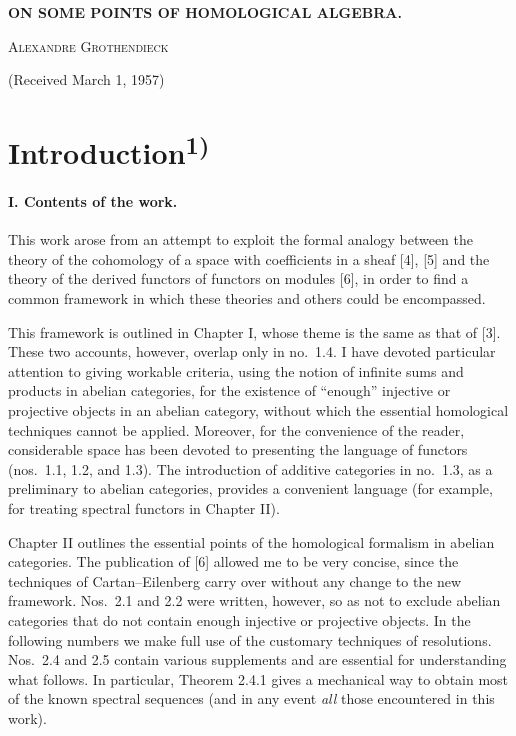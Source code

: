 \begin{center}
  {\Large\bfseries ON SOME POINTS OF HOMOLOGICAL ALGEBRA.\par}
  \vspace{1.2em}
  {\large\scshape Alexandre Grothendieck\par}
  \vspace{1.2em}
  {(Received March 1, 1957)\par}
\end{center}

\section*{\centering Introduction\textsuperscript{1)}}

\paragraph{I. Contents of the work.}
This work arose from an attempt to exploit the formal analogy between the
theory of the cohomology of a space with coefficients in a sheaf [4], [5] and
the theory of the derived functors of functors on modules [6], in order to find
a common framework in which these theories and others could be encompassed.

This framework is outlined in Chapter I, whose theme is the same as that of
[3]. These two accounts, however, overlap only in no.~1.4. I have devoted
particular attention to giving workable criteria, using the notion of infinite
sums and products in abelian categories, for the existence of ``enough''
injective or projective objects in an abelian category, without which the
essential homological techniques cannot be applied. Moreover, for the
convenience of the reader, considerable space has been devoted to presenting
the language of functors (nos.~1.1, 1.2, and 1.3). The introduction of
additive categories in no.~1.3, as a preliminary to abelian categories,
provides a convenient language (for example, for treating spectral functors in
Chapter II).

Chapter II outlines the essential points of the homological formalism in
abelian categories. The publication of [6] allowed me to be very concise,
since the techniques of Cartan--Eilenberg carry over without any change to the
new framework. Nos.~2.1 and 2.2 were written, however, so as not to exclude
abelian categories that do not contain enough injective or projective objects.
In the following numbers we make full use of the customary techniques of
resolutions. Nos.~2.4 and 2.5 contain various supplements and are essential for
understanding what follows. In particular, Theorem 2.4.1 gives a mechanical
way to obtain most of the known spectral sequences (and in any event
\emph{all} those encountered in this work).

